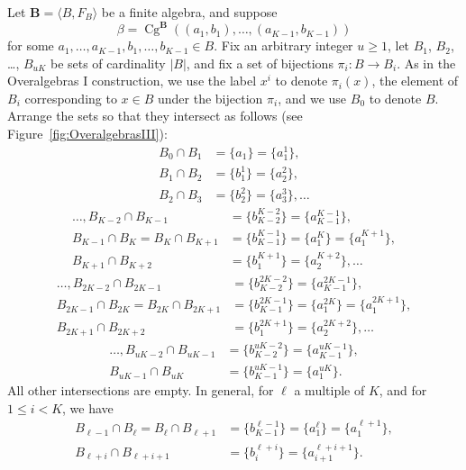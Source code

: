 \documentclass{au}
\numberwithin{equation}{section}
\theoremstyle{plain}
\theoremstyle{definition}
\newcommand{\<}{\ensuremath{\langle}}
\renewcommand{\>}{\ensuremath{\rangle}}
\newcommand{\bB}{\ensuremath{\mathbf{B}}}
\DeclareMathOperator{\Cg}{Cg}
\renewcommand{\leq}{\ensuremath{\leqslant}}
\renewcommand{\geq}{\ensuremath{\geqslant}}
\begin{document}
Let $\bB = \<B, F_B\>$ be a finite algebra, and suppose
\[
\beta = \Cg^{\bB}((a_1, b_1), \dots, (a_{K-1},b_{K-1}))
\]
for some $a_1, \dots, a_{K-1}, b_1, \dots, b_{K-1} \in B$.
Fix an arbitrary integer $u\geq 1$, let $B_1$, $B_2$, \dots, $B_{uK}$ be sets of
cardinality $|B|$, and fix a set of bijections $\pi_i\colon  B\rightarrow B_i$.
As in the Overalgebras I construction, we use the label $x^i$ to denote $\pi_i(x)$, the element of $B_i$
corresponding to $x\in B$ under the bijection $\pi_i$, and we use
$B_0$ to denote $B$.
Arrange the sets so that they intersect as follows (see Figure~\ref{fig:OveralgebrasIII}):
\begin{align*}
B_0\cap B_1 &=\{a_1\}=\{a_1^{1}\},\\
B_1\cap B_2 &=\{b^1_1\}=\{a_2^{2}\},\\
B_2\cap B_3 &=\{b^2_2\}=\{a_3^{3}\}, \dots
\end{align*}
\begin{align*}
\dots, B_{K-2}\cap B_{K-1} &= \{b_{K-2}^{K-2}\}=\{a_{K-1}^{K-1}\},\\
B_{K-1}\cap B_K = B_K\cap B_{K+1}&=\{b^{K-1}_{K-1}\}=\{a^{K}_1\}=\{a^{K+1}_1\},\\
B_{K+1}\cap B_{K+2}&=\{b^{K+1}_{1}\} =\{a^{K+2}_{2}\}, \dots %
\end{align*}
\begin{align*}
\dots, B_{2K-2}\cap B_{2K-1} &= \{b_{K-2}^{2K-2}\}=\{a_{K-1}^{2K-1}\},\\
B_{2K-1}\cap B_{2K} = B_{2K}\cap  B_{2K+1}&=\{b^{2K-1}_{K-1}\}=\{a^{2K}_{1}\}=\{a^{2K+1}_{1}\},\\
B_{2K+1}\cap B_{2K+2}&=\{b^{2K+1}_{1}\} =\{a^{2K+2}_{2}\},\dots %
\end{align*}
\begin{align*}
\dots, B_{uK-2}\cap B_{uK-1} &= \{b^{uK-2}_{K-2}\}=\{a^{uK-1}_{K-1}\},\\
B_{uK-1}\cap B_{uK}&=\{b^{uK-1}_{K-1}\}=\{a^{uK}_{1}\}.
\end{align*}
All other intersections are empty.
In general, for $\ell$ a multiple of $K$,
and for $1\leq i < K$, we have
\begin{align*}
B_{\ell-1}\cap B_{\ell} = B_{\ell}\cap  B_{\ell+1}&=\{b^{\ell-1}_{K-1}\}=\{a^{\ell}_{1}\}=\{a^{\ell+1}_{1}\},\\
B_{\ell+i} \cap
B_{\ell+i+1} &= \{b_i^{\ell+i}\} = \{a_{i+1}^{\ell+i+1}\}.
\end{align*}
\end{document}
